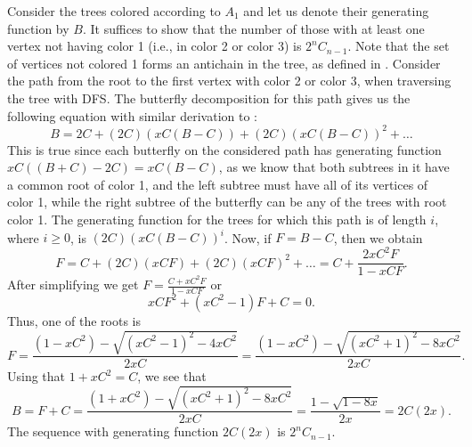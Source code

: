 \documentclass[12pt]{amsart}
\begin{document}
\begin{description}
Consider the trees colored according to $A_1$ and let us denote their generating function by $B$. It suffices to show that the number of those with at least one vertex not having color 1 (i.e., in color 2 or color 3) is $2^{n}C_{n-1}$. Note that the set of vertices not colored 1 forms an antichain in the tree, as defined in \cite{Klazar1997Twelve}. Consider the path from the root to the first vertex with color 2 or color 3, when traversing the tree with DFS. The butterfly decomposition for this path gives us the following equation with similar derivation to \cite[Equation~2.2]{CLS2007Butterfly}:
\begin{equation*}
    B = 2C + (2C)(xC(B-C)) + (2C)(xC(B-C))^{2} + \ldots
\end{equation*} 
This is true since each butterfly on the considered path has generating function $xC((B+C)-2C) = xC(B-C)$, as we know that both subtrees in it have a common root of color 1, and the left subtree must have all of its vertices of color 1, while the right subtree of the butterfly can be any of the trees with root color 1. The generating function for the trees for which this path is of length $i$, where $i\geq 0$, is $(2C)(xC(B-C))^{i}$. Now, if $F=B-C$, then we obtain
\begin{equation*}
    F = C + (2C)(xCF) + (2C)(xCF)^{2} + \ldots = C+ \frac{2xC^{2}F}{1-xCF}.
\end{equation*}
After simplifying we get $F= \frac{C+xC^{2}F}{1-xCF}$ or 
\begin{equation*}
    xCF^{2} + (xC^{2}-1)F + C = 0.
\end{equation*}
Thus, one of the roots is  
\begin{equation*}
    F = \frac{(1-xC^{2})-\sqrt{(xC^{2}-1)^{2}-4xC^{2}}}{2xC} = \frac{(1-xC^{2})-\sqrt{(xC^{2}+1)^{2}-8xC^{2}}}{2xC}.
\end{equation*}
Using that $1+xC^{2}= C$, we see that 
\begin{equation*}
    B = F+C = \frac{(1+xC^{2})-\sqrt{(xC^{2}+1)^{2}-8xC^{2}}}{2xC} = \frac{1-\sqrt{1-8x}}{2x} = 2C(2x).
\end{equation*}
The sequence with generating function $2C(2x)$ is $2^{n}C_{n-1}$.


\end{description}
\end{document}
